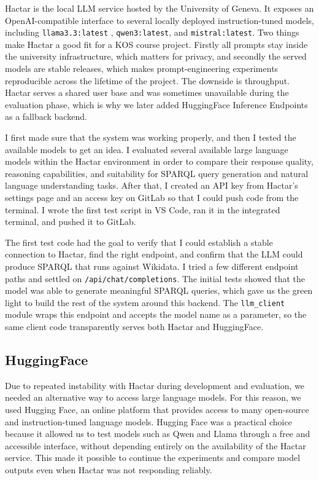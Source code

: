 \documentclass[11pt,a4paper]{article}
\begin{document}
Hactar is the local LLM service hosted by the University of Geneva. It exposes an
OpenAI-compatible interface to several locally deployed
instruction-tuned models, including \texttt{llama3.3:latest}
\cite{touvron2023llama2}, \texttt{qwen3:latest}, and
\texttt{mistral:latest}. Two things make Hactar a good fit for a
KOS course project. Firstly all prompts stay inside the university
infrastructure, which matters for privacy, and secondly the served models are
stable releases, which makes prompt-engineering experiments
reproducible across the lifetime of the project. The downside is
throughput. Hactar serves a shared user base and was sometimes
unavailable during the evaluation phase, which is why we later added
HuggingFace Inference Endpoints as a fallback backend.

I first made sure that the system was working properly, and then I tested the available models to get an idea. I evaluated several available large language models within the Hactar environment in order to compare their response quality, reasoning capabilities, and suitability for SPARQL query generation and natural language understanding tasks. 
After that, I created an API key from Hactar's
settings page and an access key on GitLab so that I could push code
from the terminal. I wrote the first test script in VS Code, ran it
in the integrated terminal, and pushed it to GitLab. 

The first test code had the goal to verify that I could establish
a stable connection to Hactar, find the right endpoint, and confirm
that the LLM could produce SPARQL that runs against Wikidata. I tried
a few different endpoint paths and settled on
\texttt{/api/chat/completions}. The initial tests showed that the
model was able to generate meaningful SPARQL queries, which gave us
the green light to build the rest of the system around this backend.
The \texttt{llm\_client} module wraps this endpoint and accepts the
model name as a parameter, so the same client code transparently
serves both Hactar and HuggingFace.

\subsection{HuggingFace}

Due to repeated instability with Hactar during development and evaluation, we needed an alternative way to access large language models. For this reason, we used Hugging Face, an online platform that provides access to many open-source and instruction-tuned language models. Hugging Face was a practical choice because it allowed us to test models such as Qwen and Llama through a free and accessible interface, without depending entirely on the availability of the Hactar service. This made it possible to continue the experiments and compare model outputs even when Hactar was not responding reliably.
\end{document}
